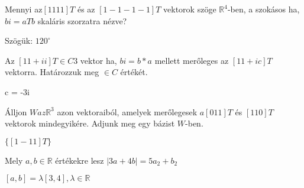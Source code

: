 \begin{frame}
  \begin{tcolorbox}[title={10/1. -N-}]
    Mennyi az$[1 1 1 1]T$ és az $[1 -1 -1 -1]T$ vektorok szöge $\mathbb{R}^4$-ben, a szokásos ha, $bi = aTb$ skaláris szorzatra nézve?

  \tcblower

    \mmedskip 
    
    Szögük: $120^{\circ}$

  \end{tcolorbox}
\end{frame}


\begin{frame}
  \begin{tcolorbox}[title={10/2. -R-}]
    Az $[1 1 + i i]T \in C3$ vektor ha, $bi = b*a$ mellett merőleges az $[1 1 + i c]T$ vektorra. Határozzuk meg $ \in C$ értékét.


  \tcblower

    \mmedskip 
    
    c = -3i
  \end{tcolorbox}
\end{frame}


\begin{frame}
  \begin{tcolorbox}[title={10/3. -R-}]
    Álljon $W az \mathbb{R}^3$ azon vektoraiból, amelyek merőlegesek $a[0 1 1]T$ és $[1 1 0]T$ vektorok mindegyikére. Adjunk meg egy bázist $W$-ben.

  \tcblower

    \mmedskip 
    
    $\{[1 -1 1]T\}$
  \end{tcolorbox}
\end{frame}


\begin{frame}
  \begin{tcolorbox}[title={10/4. -Q-}]
    Mely $a,b \in \mathbb{R}$ értékekre lesz $|3a + 4b| = 5a_2 + b_2$

  \tcblower

    \mmedskip 
    
    $[a,b] = {\lambda}[3,4], {\lambda} \in \mathbb{R}$
  \end{tcolorbox}
\end{frame}


